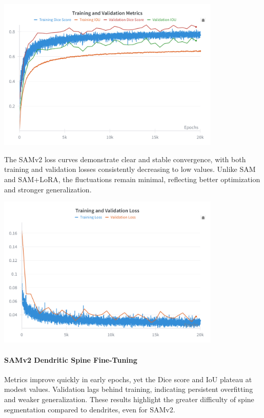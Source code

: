 \begin{center}
\includegraphics[width=0.8\textwidth]{figures/52_samv2_dendrites_metrics.png}
\label{fig:samv2_dendrite_training_validation}
\end{center}

The SAMv2 loss curves demonstrate clear and stable convergence, with both training and validation losses consistently decreasing to low values. Unlike SAM and SAM+LoRA, the fluctuations remain minimal, reflecting better optimization and stronger generalization.

\begin{center}
\includegraphics[width=0.8\textwidth]{figures/53_samv2_dendrites_loss.png}
\label{fig:samv2_dendrite_loss}
\end{center}


\paragraph{SAMv2 Dendritic Spine Fine-Tuning}
\newline
Metrics improve quickly in early epochs, yet the Dice score and IoU plateau at modest values. Validation lags behind training, indicating persistent overfitting and weaker generalization. These results highlight the greater difficulty of spine segmentation compared to dendrites, even for SAMv2.

